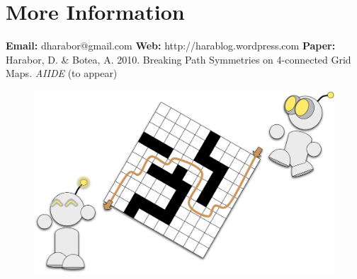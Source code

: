 
\section{More Information}
\textbf{Email:} dharabor@gmail.com
\newline \newline
\textbf{Web: } http://harablog.wordpress.com
\newline \newline
\textbf{Paper:} Harabor, D. \& Botea, A. 2010.
Breaking Path Symmetries on 4-connected Grid Maps. \emph{AIIDE} (to appear) 


\vspace{1em}
 \begin{figure}[h]
 \centering
		\includegraphics[width=0.95\columnwidth]{diagrams/robot_splash.pdf}
 \end{figure}

